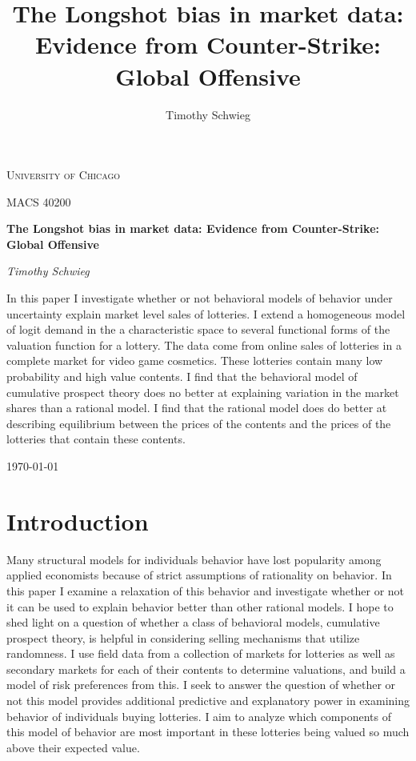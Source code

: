 \documentclass[12pt]{paper}
\title{The Longshot bias in market data: Evidence from Counter-Strike:
  Global Offensive}
\author{Timothy Schwieg}
\renewcommand\maketitle{}
\begin{document}
\maketitle


\begin{titlepage}
\centering
{\scshape\LARGE University of Chicago\par}
\vspace{1cm}
{\scshape\Large MACS 40200\par}
\vspace{1.5cm}
{\huge\bfseries The Longshot bias in market data: Evidence from Counter-Strike:
  Global Offensive\par}
\vspace{2cm}
{\Large\itshape Timothy Schwieg\par}
\vfill
\justify
In this paper I investigate whether or not behavioral models of
behavior under uncertainty explain market level sales of
lotteries. I extend a homogeneous model of logit demand in the a
characteristic space to several functional forms of the valuation
function for a lottery. The data come from online sales of lotteries
in a complete market for video game cosmetics. These lotteries contain
many low probability and high value contents. I find that the
behavioral model of cumulative prospect theory does no better at
explaining variation in the market shares than a rational model. I
find that the rational model does do better at describing equilibrium
between the prices of the contents and the prices of the lotteries
that contain these contents. 
\vfill
\centering
{\large \today\par}
\end{titlepage}


\section{Introduction}

Many structural models for individuals behavior have lost popularity
among applied economists because of strict assumptions of rationality
on behavior. In this paper I examine a relaxation of this behavior and
investigate whether or not it can be used to explain behavior better
than other rational models.  I hope to shed light on a question of
whether a class of behavioral models, cumulative prospect theory, is
helpful in considering selling mechanisms that utilize randomness. I
use field data from a collection of markets for lotteries as well as
secondary markets for each of their contents to determine valuations,
and build a model of risk preferences from this. I seek to answer the
question of whether or not this model provides additional predictive
and explanatory power in examining behavior of individuals buying
lotteries. I aim to analyze which components of this model of behavior
are most important in these lotteries being valued so much above their
expected value.
\end{document}
